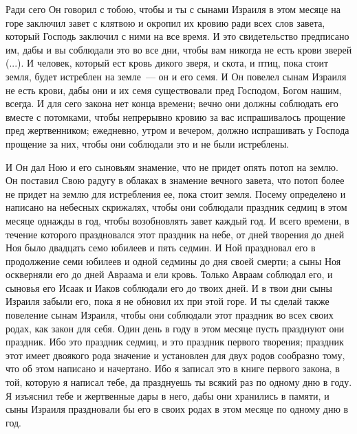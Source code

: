 Ради сего Он говорил с тобою, чтобы и ты с сынами Израиля в этом месяце на
горе заключил завет с клятвою и окропил их кровию ради всех слов завета,
который Господь заключил с ними на все время. И это свидетельство предписано
им, дабы и вы соблюдали это во все дни, чтобы вам никогда не есть крови
зверей (...). И человек, который ест кровь дикого зверя, и скота, и птиц, пока
стоит земля, будет истреблен на земле~--- он и его семя. И Он повелел сынам
Израиля не есть крови, дабы они и их семя существовали пред Господом, Богом
нашим, всегда. И для сего закона нет конца времени; вечно они должны соблюдать
его вместе с потомками, чтобы непрерывно кровию за вас испрашивалось прощение
пред жертвенником; ежедневно, утром и вечером, должно испрашивать у Господа
прощение за них, чтобы они соблюдали это и не были истреблены.

И Он дал Ною и его сыновьям знамение, что не придет опять потоп на землю. Он
поставил Свою радугу в облаках в знамение вечного завета, что потоп более не
придет на землю для истребления ее, пока стоит земля. Посему определено и
написано на небесных скрижалях, чтобы они соблюдали праздник седмиц в этом
месяце однажды в год, чтобы возобновлять завет каждый год. И всего времени, в
течение которого праздновался этот праздник на небе, от дней творения до дней
Ноя было двадцать семо юбилеев и пять седмин. И Ной праздновал его в
продолжение семи юбилеев и одной седмины до дня своей смерти; а сыны Ноя
оскверняли его до дней Авраама и ели кровь. Только Авраам соблюдал его, и
сыновья его Исаак и Иаков соблюдали его до твоих дней. И в твои дни сыны
Израиля забыли его, пока я не обновил их при этой горе. И ты сделай также
повеление сынам Израиля, чтобы они соблюдали этот праздник во всех своих родах,
как закон для себя. Один день в году в этом месяце пусть празднуют они
праздник. Ибо это праздник седмиц, и это праздник первого творения; праздник
этот имеет двоякого рода значение и установлен для двух родов
сообразно тому, что об этом написано и начертано. Ибо я записал это в книге
первого закона, в той, которую я написал тебе, да празднуешь ты всякий раз по
одному дню в году. Я изъяснил тебе и жертвенные дары в него, дабы они хранились
в памяти, и сыны Израиля праздновали бы его в своих родах в этом месяце по
одному дню в год.

